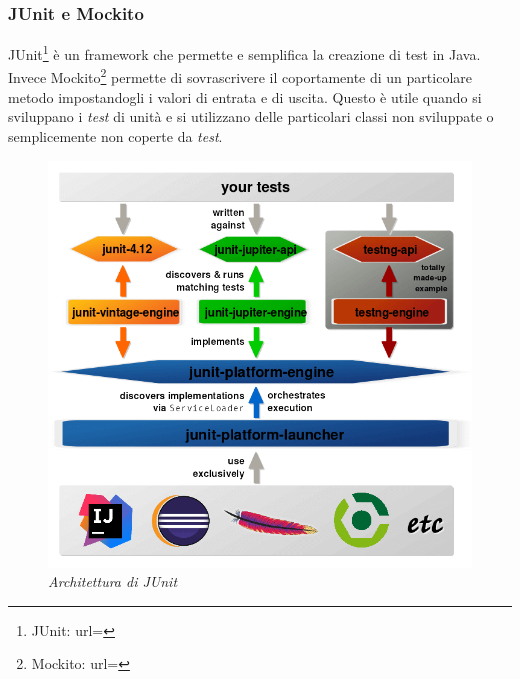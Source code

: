\subsubsection{JUnit e Mockito}
JUnit\footnote{JUnit: url= } è un framework che permette e semplifica la creazione di test in Java. Invece Mockito\footnote{Mockito: url= } permette di sovrascrivere il coportamente di un particolare metodo impostandogli i valori di entrata e di uscita. Questo è utile quando si sviluppano i \textit{test} di unità e si utilizzano delle particolari classi non sviluppate o semplicemente non coperte da \textit{test}.
\newpage
\begin{figure}[h!]
	\centering
	\includegraphics[scale=0.27]{immagini/junit.png}
	
	\caption{\textit{Architettura di JUnit }}
\end{figure}




